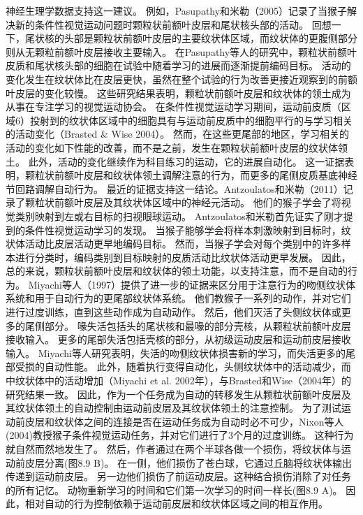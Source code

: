 神经生理学数据支持这一建议。
例如，Pasupathy和米勒（2005）记录了当猴子解决新的条件性视觉运动问题时颗粒状前额叶皮层和尾状核头部的活动。
回想一下，尾状核的头部是颗粒状前额叶皮层的主要纹状体区域，而纹状体的更腹侧部分则从无颗粒前额叶皮层接收主要输入。
在Pasupathy等人的研究中，颗粒状前额叶皮质和尾状核头部的细胞在试验中随着学习的进展而逐渐提前编码目标。
活动的变化发生在纹状体比在皮层更快，虽然在整个试验的行为改善更接近观察到的前额叶皮层的变化较慢。
这些研究结果表明，颗粒状前额叶皮层和纹状体的领土成为从事在专注学习的视觉运动协会。
在条件性视觉运动学习期间，运动前皮质（区域6）投射到的纹状体区域中的细胞具有与运动前皮质中的细胞平行的与学习相关的活动变化（Brasted \& Wise 2004）。
然而，在这些更尾部的地区，学习相关的活动的变化如下性能的改善，而不是之前，发生在颗粒状前额叶皮层的纹状体领土。
此外，活动的变化继续作为科目练习的运动，它的进展自动化。
这一证据表明，颗粒状前额叶皮层和纹状体领土调解注意的行为，而更多的尾侧皮质基底神经节回路调解自动行为。
最近的证据支持这一结论。Antzoulatos和米勒（2011）记录了颗粒状前额叶皮层及其纹状体区域中的神经元活动。
他们的猴子学会了将视觉类别映射到左或右目标的扫视眼球运动。
Antzoulatos和米勒首先证实了刚才提到的条件性视觉运动学习的发现。
当猴子能够学会将样本刺激映射到目标时，纹状体活动比皮层活动更早地编码目标。
然而，当猴子学会对每个类别中的许多样本进行分类时，编码类别到目标映射的皮质活动比纹状体活动更早发展。
因此，总的来说，颗粒状前额叶皮层和纹状体的领土功能，以支持注意，而不是自动的行为。
Miyachi等人（1997）提供了进一步的证据来区分用于注意行为的吻侧纹状体系统和用于自动行为的更尾部纹状体系统。
他们教猴子一系列的动作，并对它们进行过度训练，直到这些动作成为自动动作。
然后，他们灭活了头侧纹状体或更多的尾侧部分。
喙失活包括头的尾状核和最喙的部分壳核，从颗粒状前额叶皮层接收输入。
更多的尾部失活包括壳核的部分，从初级运动皮层和运动前皮层接收输入。
Miyachi等人研究表明，失活的吻侧纹状体损害新的学习，而失活更多的尾部受损的自动性能。
此外，随着执行变得自动化，头侧纹状体中的活动减少，而中纹状体中的活动增加（Miyachi et al. 2002年），与Brasted和Wise（2004年）的研究结果一致。
因此，作为一个任务成为自动的转移发生从颗粒状前额叶皮层及其纹状体领土的自动控制由运动前皮层及其纹状体领土的注意控制。
为了测试运动前皮层和纹状体之间的连接是否在运动任务成为自动时必不可少，Nixon等人(2004)教授猴子条件视觉运动任务，并对它们进行了3个月的过度训练。
这种行为就自然而然地发生了。
然后，作者通过在两个半球各做一个损伤，将纹状体与运动前皮层分离(图8.9 B)。
在一侧，他们损伤了苍白球，它通过丘脑将纹状体输出传递到运动前皮层。
另一边他们损伤了前运动皮层。这种结合损伤消除了对任务的所有记忆。
动物重新学习的时间和它们第一次学习的时间一样长(图8.9 A)。
因此，相对自动的行为控制依赖于运动前皮层和纹状体区域之间的相互作用。


